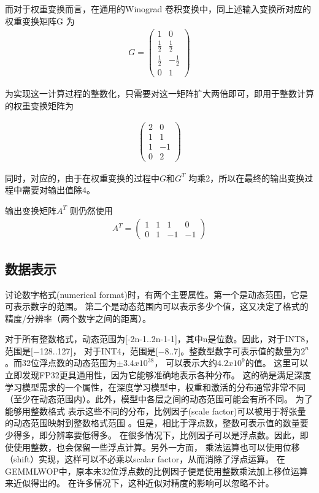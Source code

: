 而对于权重变换而言，在通用的Winograd 卷积变换中，同上述输入变换所对应的权重变换矩阵G 为 
\begin{align}
G = 
\begin{pmatrix}
  1 & 0 \\
  \frac{1}{2} & \frac{1}{2} \\
  \frac{1}{2} & -\frac{1}{2} \\
  0 & 1
\end{pmatrix}
\end{align}

为实现这一计算过程的整数化，只需要对这一矩阵扩大两倍即可，即用于整数计算的权重变换矩阵为

\begin{align}
  \begin{pmatrix}
    2 & 0\\
    1 & 1\\
    1 & -1\\
    0 & 2
  \end{pmatrix}
\end{align}

同时，对应的，由于在权重变换的过程中$G $和$G^T $ 均乘2，所以在最终的输出变换过程中需要对输出值除4。

输出变换矩阵$A^T$ 则仍然使用
\begin{align}
  A^T = 
  \begin{pmatrix}
    1 & 1 & 1 & 0 \\
    0 & 1 & -1 & -1
  \end{pmatrix}
\end{align}

\subsection{数据表示}

讨论数字格式(numerical format)时，有两个主要属性。第一个是动态范围，它是可表示数字的范围。
第二个是动态范围内可以表示多少个值，这又决定了格式的精度/分辨率（两个数字之间的距离）。

对于所有整数格式，动态范围为[-2n-1..2n-1-1]，其中n是位数。因此，对于INT8，范围是[−128..127]，
对于INT4，范围是[−8..7]。整数型数字可表示值的数量为$2^n$。而32位浮点数的动态范围为$\pm3.4 x 10^38$，
可以表示大约$4.2 x 10^9$的值。 这里可以立即发现FP32更具通用性，因为它能够准确地表示各种分布。
这的确是满足深度学习模型需求的一个属性，在深度学习模型中，权重和激活的分布通常非常不同
（至少在动态范围内）。此外，模型中各层之间的动态范围可能会有所不同。 为了能够用整数格式
表示这些不同的分布，比例因子(scale factor)可以被用于将张量的动态范围映射到整数格式范围
。但是，相比于浮点数，整数可表示值的数量要少得多，即分辨率要低得多。
在很多情况下，比例因子可以是浮点数。因此，即使使用整数，也会保留一些浮点计算。另外一方面，
乘法运算也可以使用位移（shift）实现，这样可以不必乘以scalar factor，从而消除了浮点运算。
在GEMMLWOP中，原本未32位浮点数的比例因子便是使用整数乘法加上移位运算来近似得出的。
在许多情况下，这种近似对精度的影响可以忽略不计。

